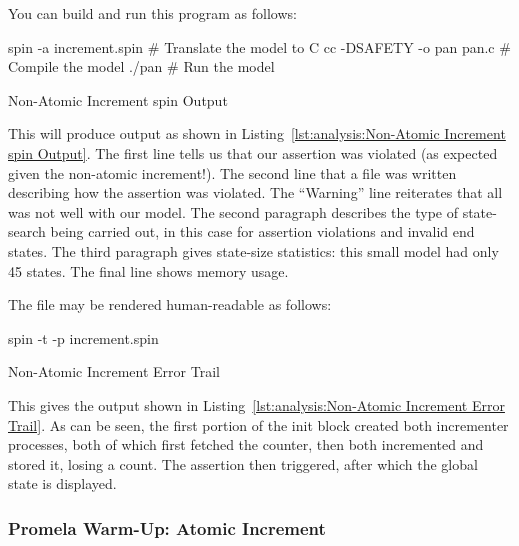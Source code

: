 You can build and run this program as follows:

\begin{VerbatimU}
spin -a increment.spin      # Translate the model to C
cc -DSAFETY -o pan pan.c    # Compile the model
./pan                       # Run the model
\end{VerbatimU}

\begin{listing}[tbp]
\vspace*{-9pt}
\caption{Non-Atomic Increment spin Output}
\label{lst:analysis:Non-Atomic Increment spin Output}
\end{listing}

This will produce output as shown in
Listing~\ref{lst:analysis:Non-Atomic Increment spin Output}.
The first line tells us that our assertion was violated (as expected
given the non-atomic increment!).
The second line that a  file was written describing how the
assertion was violated.
The ``Warning'' line reiterates that all was not well with our model.
The second paragraph describes the type of state-search being carried out,
in this case for assertion violations and invalid end states.
The third paragraph gives state-size statistics: this small model had only
45 states.
The final line shows memory usage.

The  file may be rendered human-readable as follows:

\begin{VerbatimU}
spin -t -p increment.spin
\end{VerbatimU}

\begin{listing*}[htbp]
\vspace*{-9pt}
\caption{Non-Atomic Increment Error Trail}
\label{lst:analysis:Non-Atomic Increment Error Trail}
\end{listing*}

This gives the output shown in
Listing~\ref{lst:analysis:Non-Atomic Increment Error Trail}.
As can be seen, the first portion of the init block created both
incrementer processes, both of which first fetched the counter,
then both incremented and stored it, losing a count.
The assertion then triggered, after which the global state is displayed.

\subsubsection{Promela Warm-Up: Atomic Increment}
\label{sec:formal:Promela Warm-Up: Atomic Increment}


